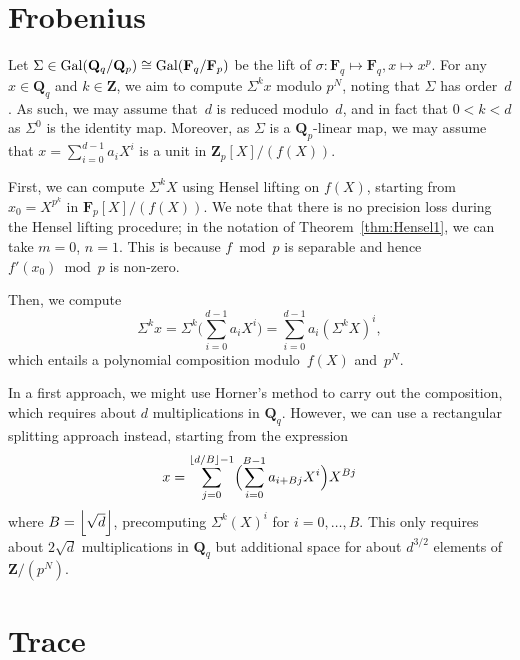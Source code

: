 \section{Frobenius}

Let $\Sigma \in \operatorname{Gal}(\mathbf{Q}_q/\mathbf{Q}_p) \cong \operatorname{Gal}(\mathbf{F}_q/\mathbf{F}_p)$ 
be the lift of $\sigma \colon \mathbf{F}_q \mapsto \mathbf{F}_q, x \mapsto x^p$. 
For any $x \in \mathbf{Q}_q$ and $k \in \mathbf{Z}$, we aim to compute $\Sigma^k x$ 
modulo $p^N$, noting that $\Sigma$ has order~$d$.  As such, we may assume that~$d$ 
is reduced modulo~$d$, and in fact that $0 < k < d$ as $\Sigma^0$ is the identity map.
Moreover, as $\Sigma$ is a $\mathbf{Q}_p$-linear map, we may assume that 
$x = \sum_{i=0}^{d-1} a_i X^i$ is a unit in $\mathbf{Z}_p[X]/(f(X))$.  

First, we can compute $\Sigma^k X$ using Hensel lifting on $f(X)$, 
starting from $x_0 = X^{p^k}$ in $\mathbf{F}_p[X] / (f(X))$.  We note 
that there is no precision loss during the Hensel lifting procedure;  
in the notation of Theorem~\ref{thm:Hensel1}, we can take $m = 0$, $n = 1$. 
This is because $f \bmod p$ is separable and hence $f'(x_0) \bmod p$ is 
non-zero.

Then, we compute 
\begin{equation}
\Sigma^k x = 
    \Sigma^k \bigl( \sum_{i=0}^{d-1} a_i X^i \bigr) = 
    \sum_{i=0}^{d-1} a_i (\Sigma^k X)^i, 
\end{equation}
which entails a polynomial composition modulo~$f(X)$ and~$p^N$.

\begin{rem}
In a first approach, we might use Horner's method to carry out the 
composition, which requires about $d$ multiplications in $\mathbf{Q}_q$.
However, we can use a rectangular splitting approach instead, starting 
from the expression 
\begin{equation}
x = \sum_{j=0}^{\left\lfloor d/B\right\rfloor-1} \Bigl( \sum_{i=0}^{B-1} a_{i+Bj} X^i  \Bigr) X^{Bj}
\end{equation}
where $B = \left\lfloor\sqrt{d}\right\rfloor$, precomputing $\Sigma^k(X)^i$ for $i = 0, \dotsc, B$. 
This only requires about $2 \sqrt{d}$ multiplications in $\mathbf{Q}_q$ 
but additional space for about $d^{3/2}$ elements of $\mathbf{Z}/(p^N)$.
\end{rem}

\section{Trace}

